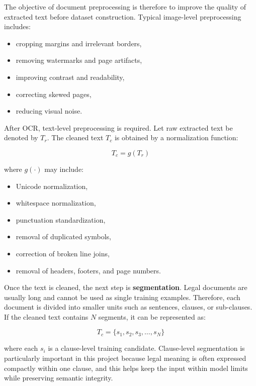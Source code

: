 \documentclass[12pt]{report}
\begin{document}
The objective of document preprocessing is therefore to improve the quality of extracted text before dataset construction. Typical image-level preprocessing includes:
\begin{itemize}
    \item cropping margins and irrelevant borders,
    \item removing watermarks and page artifacts,
    \item improving contrast and readability,
    \item correcting skewed pages,
    \item reducing visual noise.
\end{itemize}

After OCR, text-level preprocessing is required. Let raw extracted text be denoted by $T_r$. The cleaned text $T_c$ is obtained by a normalization function:

\begin{equation}
T_c = g(T_r)
\end{equation}

where $g(\cdot)$ may include:
\begin{itemize}
    \item Unicode normalization,
    \item whitespace normalization,
    \item punctuation standardization,
    \item removal of duplicated symbols,
    \item correction of broken line joins,
    \item removal of headers, footers, and page numbers.
\end{itemize}

Once the text is cleaned, the next step is \textbf{segmentation}. Legal documents are usually long and cannot be used as single training examples. Therefore, each document is divided into smaller units such as sentences, clauses, or sub-clauses. If the cleaned text contains $N$ segments, it can be represented as:

\begin{equation}
T_c = \{s_1, s_2, s_3, \dots, s_N\}
\end{equation}

where each $s_i$ is a clause-level training candidate. Clause-level segmentation is particularly important in this project because legal meaning is often expressed compactly within one clause, and this helps keep the input within model limits while preserving semantic integrity.
\end{document}
